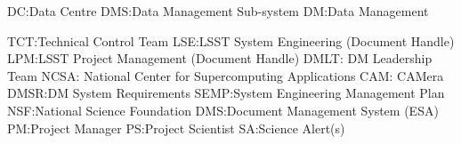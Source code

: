 
DC:Data Centre
DMS:Data Management Sub-system
DM:Data Management

TCT:Technical Control Team
LSE:LSST System Engineering (Document Handle)
LPM:LSST Project Management (Document Handle)
DMLT: DM Leadership Team
NCSA: National Center for Supercomputing Applications
CAM: CAMera
DMSR:DM System Requirements
SEMP:System Engineering Management Plan
NSF:National Science Foundation
DMS:Document Management System (ESA)
PM:Project Manager
PS:Project Scientist
SA:Science Alert(s)

